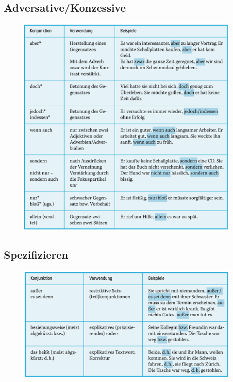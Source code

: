 \documentclass[UTF8]{report}
\begin{document}
\subsection{Adversative/Konzessive}
\begin{figure}[H]
    \centering
    \includegraphics[scale=0.65]{knz.png}
\end{figure}

\subsection{Spezifizieren}
\begin{figure}[H]
    \centering
    \includegraphics[scale=0.55]{spc.png}
\end{figure}
\end{document}
